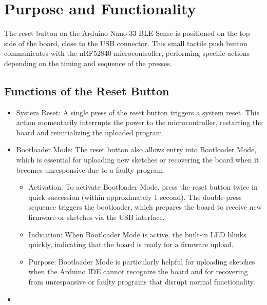 \section{Purpose and Functionality}

The reset button on the Arduino Nano 33 BLE Sense is positioned on the top side of the board, close to the USB connector. This small tactile push button communicates with the nRF52840 microcontroller, performing specific actions depending on the timing and sequence of the presses.

\subsection{Functions of the Reset Button}

\begin{itemize}
\item System Reset: A single press of the reset button triggers a system reset. This action momentarily interrupts the power to the microcontroller, restarting the board and reinitializing the uploaded program. 


\item Bootloader Mode: The reset button also allows entry into Bootloader Mode, which is essential for uploading new sketches or recovering the board when it becomes unresponsive due to a faulty program.

	\begin{itemize}
		
	\item  Activation: To activate Bootloader Mode, press the reset button twice in quick succession (within approximately 1 second). The double-press sequence triggers the bootloader, which prepares the board to receive new firmware or sketches via the USB interface.

	\item Indication: When Bootloader Mode is active, the built-in LED blinks quickly, indicating that the board is ready for a firmware upload.

	\item Purpose: Bootloader Mode is particularly helpful for uploading sketches when the Arduino IDE cannot recognize the board and for recovering from unresponsive or faulty programs that disrupt normal functionality.
	
	\end{itemize}

\item 

\end{itemize}






